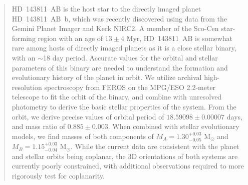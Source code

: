 \documentclass[]{aastex701} %
\begin{document}
\author[0000-0002-9156-9651]{Adam J. R. W. Smith}

\author[0000-0002-5815-7372]{Inseok Song}  

\author[0000-0003-2753-2819]{Remi Soummer}

\author[0000-0002-9121-3436]{Sandrine Thomas}

\author[0000-0002-4479-8291]{Kimberly Ward-Duong}

\author[0000-0002-9977-8255]{Schuyler G. Wolff}


\begin{abstract}


HD~143811~AB is the host star to the directly imaged planet HD~143811~AB~b, which was recently discovered using data from the Gemini Planet Imager and Keck NIRC2. A member of the Sco-Cen star-forming region with an age of $13 \pm 4$ Myr, HD~143811~AB is somewhat rare among hosts of directly imaged planets as it is a close stellar binary, with an $\sim$18 day period. Accurate values for the orbital and stellar parameters of this binary are needed to understand the formation and evolutionary history of the planet in orbit. We utilize archival high-resolution spectroscopy from FEROS on the MPG/ESO 2.2-meter telescope to fit the orbit of the binary, and combine with unresolved photometry to derive the basic stellar properties of the system. From the orbit, we derive precise values of orbital period of $18.59098 \pm 0.00007$ days, and mass ratio of $0.885 \pm 0.003$. When combined with stellar evolutionary models, we find masses of both components of $M_A = 1.30^{+0.03}_{-0.05}$ M$_\odot$ and $M_B = 1.15^{+0.03}_{-0.04}$ M$_\odot$. While the current data are consistent with the planet and stellar orbits being coplanar, the 3D orientations of both systems are currently poorly constrained, with additional observations required to more rigorously test for coplanarity.

\end{abstract}
\end{document}
